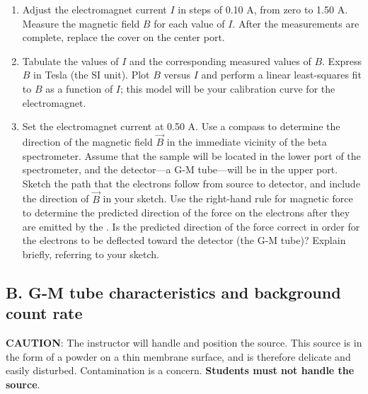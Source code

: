 \begin{enumerate}
\item Adjust the electromagnet current $I$ in steps of 0.10 A, from zero to
1.50 A.  Measure the magnetic field $B$ for each value of $I$.  After the
measurements are complete, replace the cover on the center port.

\item Tabulate the values of $I$ and the corresponding measured values of $B$.
  Express $B$ in Tesla (the SI unit).  Plot $B$ versus $I$ and perform a linear
  least-squares fit to $B$ as a function of $I$; this model will be your
  calibration curve for the electromagnet.

\item Set the electromagnet current at 0.50 A.  Use a compass to determine the
  direction of the magnetic field $\vec{B}$ in the immediate vicinity of the
  beta spectrometer.  Assume that the \cs sample will be located in the lower
  port of the spectrometer, and the detector---a G-M tube---will be in the upper
  port.  Sketch the path that the electrons follow from source to detector, and
  include the direction of $\vec{B}$ in your sketch.  Use the right-hand rule
  for magnetic force to determine the predicted direction of the force on the
  electrons after they are emitted by the \cs.  Is the predicted direction of
  the force correct in order for the electrons to be deflected toward the
  detector (the G-M tube)?  Explain briefly, referring to your sketch.

\end{enumerate}

\subsection{B.  G-M tube characteristics and background count rate}

{\bf CAUTION}: The instructor will handle and
position the \cs source.  This source is in the form of a powder on
a thin membrane surface, and is therefore delicate and easily
disturbed.  Contamination is a concern.  {\bf Students must not handle the
\cs source}.

